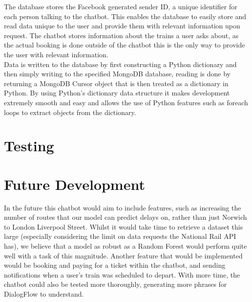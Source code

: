 \documentclass[12pt,a4paper]{article}
\begin{document}
    The database stores the Facebook generated sender ID, a unique identifier for each person talking to the chatbot. This enables the database to easily store and read data unique to the user and provide them with relevant information upon request. The chatbot stores information about the trains a user asks about, as the actual booking is done outside of the chatbot this is the only way to provide the user with relevant information. \\
    
    Data is written to the database by first constructing a Python dictionary and then simply writing to the specified MongoDB database, reading is done by returning a MongoDB Cursor object that is then treated as a dictionary in Python. By using Python's dictionary data structure it makes development extremely smooth and easy and allows the use of Python features such as foreach loops to extract objects from the dictionary.
    
    \section{Testing}

    \section{Future Development}
    In the future this chatbot would aim to include features, such as increasing the number of routes that our model can predict delays on, rather than just Norwich to London Liverpool Street. Whilst it would take time to retrieve a dataset this large (especially considering the limit on data requests the National Rail API has), we believe that a model as robust as a Random Forest would perform quite well with a task of this magnitude. Another feature that would be implemented would be booking and paying for a ticket within the chatbot, and sending notifications when a user's train was scheduled to depart. With more time, the chatbot could also be tested more thoroughly, generating more phrases for DialogFlow to understand.
    
    
    
    
\end{document}
